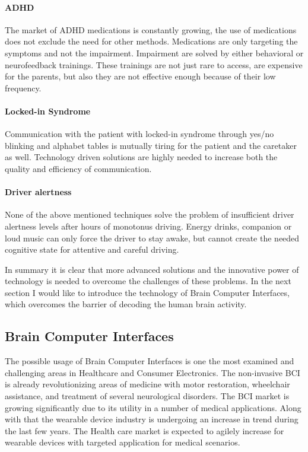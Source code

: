 \documentclass[letterpaper,10pt]{article}
\let\oldsubsection\subsection
\renewcommand{\subsection}{\def\cursectioning{subsection}\oldsubsection}
\begin{document}
\paragraph{ADHD}The market of ADHD medications is constantly growing, the use of medications does not exclude the need for other methods. Medications are only targeting the symptoms and not the impairment. Impairment are solved by either behavioral or neurofeedback trainings. These trainings are not just rare to access, are expensive for the parents, but also they are not effective enough because of their low frequency.

\paragraph{Locked-in Syndrome}Communication with the patient with locked-in syndrome through yes/no blinking and alphabet tables is mutually tiring for the patient and the caretaker as well. Technology driven solutions are highly needed to increase both the quality and efficiency of communication. 

\paragraph{Driver alertness} None of the above mentioned techniques solve the problem of insufficient driver alertness levels after hours of monotonus driving. Energy drinks, companion or loud music can only force the driver to stay awake, but cannot create the needed cognitive state for attentive and careful driving. 


In summary it is clear that more advanced solutions and the innovative power of technology is needed to overcome the challenges of these problems. In the next section I would like to introduce the technology of Brain Computer Interfaces, which overcomes the barrier of decoding the human brain activity.

\subsection{Brain Computer Interfaces}

The possible usage of Brain Computer Interfaces is one the most examined and challenging areas in Healthcare and Consumer Electronics. The non-invasive BCI is already revolutionizing areas of medicine with motor restoration, wheelchair assistance, and treatment of several neurological disorders. The BCI market is  growing significantly due to its utility in a number of medical applications. \cite{bci_fs} Along with that the wearable device industry is undergoing an increase in trend during the last few years. The Health care market is expected to agilely increase for wearable devices with targeted application for medical scenarios. \cite{wearable}
\end{document}
